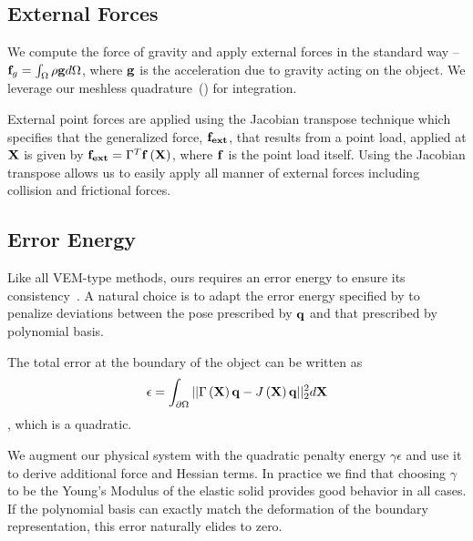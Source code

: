 \subsection{External Forces}
We compute the force of gravity and apply external forces in the standard way --
$\mathbf{f}_g = \int_{\Omega} \rho\mathbf{g} d\Omega$, where $\mathbf{g}$ is the acceleration due to gravity acting on the object. 
We leverage our meshless quadrature~() for integration.

External point forces are applied using the Jacobian transpose technique which specifies that the generalized force, $\mathbf{f_{ext}}$, 
that results from a point load, applied at $\mathbf{X}$ is given by $\mathbf{f_{ext}}=\Gamma^T\mathbf{f}\left(\mathbf{X}\right)$, where $\mathbf{f}$ is the point load itself.
Using the Jacobian transpose allows us to easily apply all manner of external forces including collision and frictional forces. 

\subsection{Error Energy}
\label{ssec:error_energy}
Like all VEM-type methods, ours requires an error energy to ensure its consistency~\cite{10.1142/S021820251440003X}.
A natural choice is to adapt the error energy specified by \citet{10.1145/1073204.1073216} to penalize deviations between the pose prescribed by  $\mathbf{q}$ and 
that prescribed by polynomial basis. 

The total error at the boundary of the object can be written as
\begin{equation}
\epsilon = \int_{\partial\Omega}||\Gamma\left(\mathbf{X}\right)\mathbf{q} - J\left(\mathbf{X}\right)\mathbf{q}||_2^2 d\mathbf{X} \\
\end{equation}, which is a quadratic.

We augment our physical system with the  quadratic penalty energy $\gamma\epsilon$ and use it to derive additional force and Hessian terms.
In practice we find that choosing $\gamma $ to be the Young's Modulus of the elastic solid provides good behavior in all cases.
If the polynomial basis can exactly match the deformation of the boundary representation, this error naturally elides to zero.

